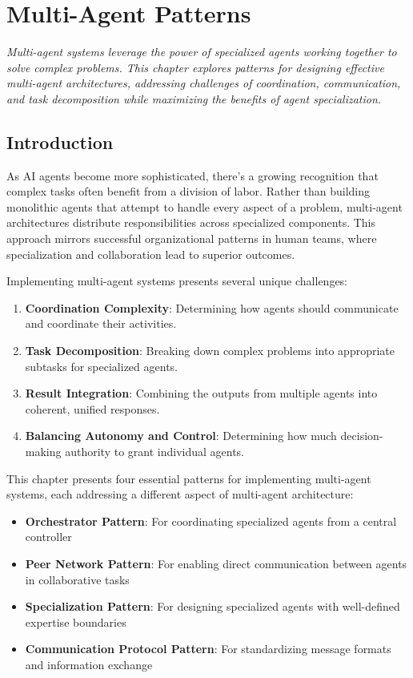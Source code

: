 \documentclass[11pt,oneside]{book}
\providecommand{\tightlist}{%
  \setlength{\itemsep}{0pt}\setlength{\parskip}{0pt}}
\begin{document}
\chapter{Multi-Agent Patterns}\label{multi-agent-patterns}

\emph{Multi-agent systems leverage the power of specialized agents
working together to solve complex problems. This chapter explores
patterns for designing effective multi-agent architectures, addressing
challenges of coordination, communication, and task decomposition while
maximizing the benefits of agent specialization.}

\section{Introduction}\label{introduction-5}

As AI agents become more sophisticated, there's a growing recognition
that complex tasks often benefit from a division of labor. Rather than
building monolithic agents that attempt to handle every aspect of a
problem, multi-agent architectures distribute responsibilities across
specialized components. This approach mirrors successful organizational
patterns in human teams, where specialization and collaboration lead to
superior outcomes.

Implementing multi-agent systems presents several unique challenges:

\begin{enumerate}
\def\labelenumi{\arabic{enumi}.}
\tightlist
\item
  \textbf{Coordination Complexity}: Determining how agents should
  communicate and coordinate their activities.
\item
  \textbf{Task Decomposition}: Breaking down complex problems into
  appropriate subtasks for specialized agents.
\item
  \textbf{Result Integration}: Combining the outputs from multiple
  agents into coherent, unified responses.
\item
  \textbf{Balancing Autonomy and Control}: Determining how much
  decision-making authority to grant individual agents.
\end{enumerate}

This chapter presents four essential patterns for implementing
multi-agent systems, each addressing a different aspect of multi-agent
architecture:

\begin{itemize}
\tightlist
\item
  \textbf{Orchestrator Pattern}: For coordinating specialized agents
  from a central controller
\item
  \textbf{Peer Network Pattern}: For enabling direct communication
  between agents in collaborative tasks
\item
  \textbf{Specialization Pattern}: For designing specialized agents with
  well-defined expertise boundaries
\item
  \textbf{Communication Protocol Pattern}: For standardizing message
  formats and information exchange
\end{itemize}
\end{document}
